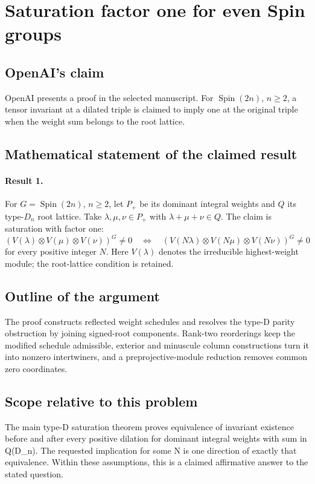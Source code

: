 \documentclass[11pt]{article}
\begin{document}
\section*{Saturation factor one for even Spin groups}

\subsection{OpenAI's claim}
OpenAI presents a proof in the selected manuscript. For $\operatorname{Spin}(2n)$, $n\geq2$, a tensor invariant at a dilated triple is claimed to imply one at the original triple when the weight sum belongs to the root lattice.

\subsection{Mathematical statement of the claimed result}
\paragraph{Result 1.} For \(G=\operatorname{Spin}(2n)\), \(n\ge2\), let \(P_+\) be its dominant integral weights and \(Q\) its type-\(D_n\) root lattice. Take \(\lambda,\mu,\nu\in P_+\) with \(\lambda+\mu+\nu\in Q\). The claim is saturation with factor one:
\[
 (V(\lambda)\otimes V(\mu)\otimes V(\nu))^G\ne0
 \quad\Longleftrightarrow\quad
 (V(N\lambda)\otimes V(N\mu)\otimes V(N\nu))^G\ne0
\]
for every positive integer \(N\). Here \(V(\lambda)\) denotes the irreducible highest-weight module; the root-lattice condition is retained.

\subsection{Outline of the argument}
The proof constructs reflected weight schedules and resolves the type-D parity obstruction by joining signed-root components. Rank-two reorderings keep the modified schedule admissible, exterior and minuscule column constructions turn it into nonzero intertwiners, and a preprojective-module reduction removes common zero coordinates.

\subsection{Scope relative to this problem}
The main type-D saturation theorem proves equivalence of invariant existence before and after every positive dilation for dominant integral weights with sum in Q(D\_n). The requested implication for some N is one direction of exactly that equivalence. Within these assumptions, this is a claimed affirmative answer to the stated question.
\end{document}
